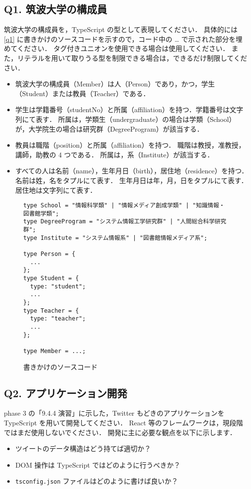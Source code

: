\documentclass[a4j, 11pt]{jarticle}
\begin{document}
\subsection*{Q1. 筑波大学の構成員}

筑波大学の構成員を，TypeScript の型として表現してください．
具体的には \autoref{q1} に書きかけのソースコードを示すので，コード中の … で示された部分を埋めてください．
タグ付きユニオンを使用できる場合は使用してください．
また，リテラルを用いて取りうる型を制限できる場合は，できるだけ制限してください．

\begin{itemize}
  \setlength{\itemsep}{0mm}
  \item 筑波大学の構成員（Member）は人（Person）であり，かつ，学生（Student）または教員（Teacher）である．
  \item 学生は学籍番号（studentNo）と所属（affiliation）を持つ．学籍番号は文字列にて表す．
  所属は，学類生（undergraduate）の場合は学類（School）が，大学院生の場合は研究群（DegreeProgram）が該当する．
  \item 教員は職階（position）と所属（affiliation）を持つ．
  職階は教授，准教授，講師，助教の 4 つである．
  所属は，系（Institute）が該当する．
  \item すべての人は名前（name），生年月日（birth），居住地（residence）を持つ．
  名前は姓，名をタプルにて表す．
  生年月日は年，月，日をタプルにて表す．
  居住地は文字列にて表す．
\end{itemize}

\begin{figure}[H]
\caption{書きかけのソースコード}
\label{q1}
\begin{lstlisting}
type School = "情報科学類" | "情報メディア創成学類" | "知識情報・図書館学類";
type DegreeProgram = "システム情報工学研究群" | "人間総合科学研究群";
type Institute = "システム情報系" | "図書館情報メディア系";

type Person = {
  ...
};
type Student = {
  type: "student";
  ...
};
type Teacher = {
  type: "teacher";
  ...
};

type Member = ...;
\end{lstlisting}
\end{figure}

\subsection*{Q2. アプリケーション開発}

phase 3 の「9.4.4 演習」に示した，Twitter もどきのアプリケーションを TypeScript を用いて開発してください．
React 等のフレームワークは，現段階ではまだ使用しないでください．
開発に主に必要な観点を以下に示します．

\begin{itemize}
  \setlength{\itemsep}{0mm}
  \item ツイートのデータ構造はどう持てば適切か？
  \item DOM 操作は TypeScript ではどのように行うべきか？
  \item \verb|tsconfig.json| ファイルはどのように書けば良いか？
\end{itemize}
\end{document}
